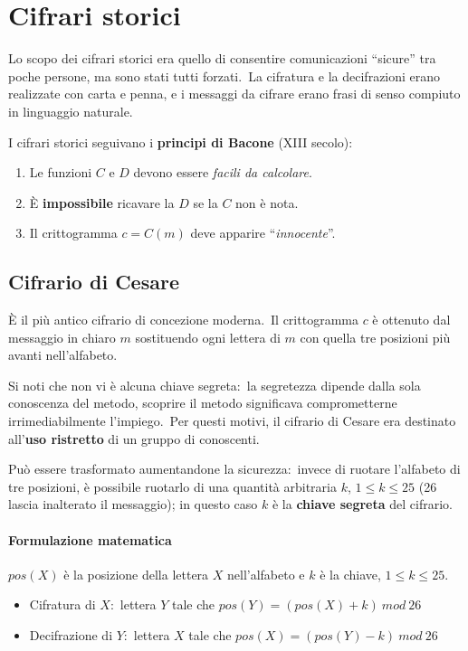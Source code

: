 \chapter{Cifrari storici}

Lo scopo dei cifrari storici era quello di consentire comunicazioni ``sicure'' tra poche persone, ma sono stati tutti forzati.\
La cifratura e la decifrazioni erano realizzate con carta e penna, e i messaggi da cifrare erano frasi di senso compiuto in linguaggio naturale.\

I cifrari storici seguivano i \textbf{principi di Bacone} (XIII secolo):
\begin{enumerate}
    \item Le funzioni $C$ e $D$ devono essere \textit{facili da calcolare}.
    \item È \textbf{impossibile} ricavare la $D$ se la $C$ non è nota.
    \item Il crittogramma $c=C(m)$ deve apparire ``\textit{innocente}''.
\end{enumerate}

\section{Cifrario di Cesare}

È il più antico cifrario di concezione moderna.\
Il crittogramma $c$ è ottenuto dal messaggio in chiaro $m$ sostituendo ogni lettera di $m$ con quella tre posizioni più avanti nell'alfabeto.\

Si noti che non vi è alcuna chiave segreta:\ la segretezza dipende dalla sola conoscenza del metodo, scoprire il metodo significava comprometterne irrimediabilmente l'impiego.\
Per questi motivi, il cifrario di Cesare era destinato all'\textbf{uso ristretto} di un gruppo di conoscenti.\

Può essere trasformato aumentandone la sicurezza:\ invece di ruotare l'alfabeto di tre posizioni, è possibile ruotarlo di una quantità arbitraria $k$, $1\leq k\leq 25$ (26 lascia inalterato il messaggio); in questo caso $k$ è la \textbf{chiave segreta} del cifrario.\

\subsubsection{Formulazione matematica}

$pos(X)$ è la posizione della lettera $X$ nell'alfabeto e $k$ è la chiave, $1\leq k \leq 25$.\

\begin{itemize}
    \item Cifratura di $X$:\ lettera $Y$ tale che $pos(Y) = (pos(X) + k)\ \mathit{mod}\ 26$
    \item Decifrazione di $Y$:\ lettera $X$ tale che $pos(X) = (pos(Y) - k)\ \mathit{mod}\ 26$
\end{itemize}

